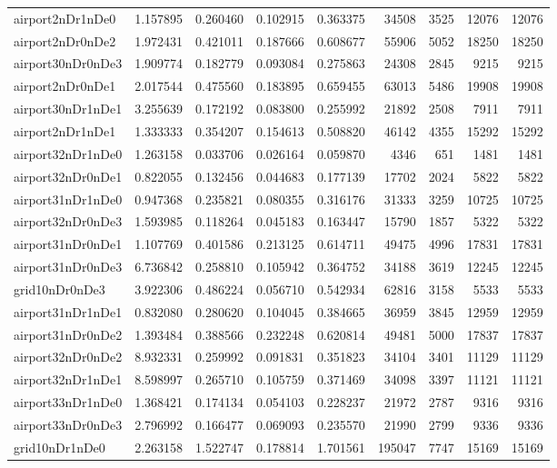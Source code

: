 \documentclass[../../../thesis.tex]{subfiles}
\begin{document}
\begin{longtable}{|l|r|r|r|r|r|r|r|r|}
airport2nDr1nDe0 & 1.157895 & 0.260460 & 0.102915 & 0.363375 & 34508 & 3525 & 12076 & 12076 \\
airport2nDr0nDe2 & 1.972431 & 0.421011 & 0.187666 & 0.608677 & 55906 & 5052 & 18250 & 18250 \\
airport30nDr0nDe3 & 1.909774 & 0.182779 & 0.093084 & 0.275863 & 24308 & 2845 & 9215 & 9215 \\
airport2nDr0nDe1 & 2.017544 & 0.475560 & 0.183895 & 0.659455 & 63013 & 5486 & 19908 & 19908 \\
airport30nDr1nDe1 & 3.255639 & 0.172192 & 0.083800 & 0.255992 & 21892 & 2508 & 7911 & 7911 \\
airport2nDr1nDe1 & 1.333333 & 0.354207 & 0.154613 & 0.508820 & 46142 & 4355 & 15292 & 15292 \\
airport32nDr1nDe0 & 1.263158 & 0.033706 & 0.026164 & 0.059870 & 4346 & 651 & 1481 & 1481 \\
airport32nDr0nDe1 & 0.822055 & 0.132456 & 0.044683 & 0.177139 & 17702 & 2024 & 5822 & 5822 \\
airport31nDr1nDe0 & 0.947368 & 0.235821 & 0.080355 & 0.316176 & 31333 & 3259 & 10725 & 10725 \\
airport32nDr0nDe3 & 1.593985 & 0.118264 & 0.045183 & 0.163447 & 15790 & 1857 & 5322 & 5322 \\
airport31nDr0nDe1 & 1.107769 & 0.401586 & 0.213125 & 0.614711 & 49475 & 4996 & 17831 & 17831 \\
airport31nDr0nDe3 & 6.736842 & 0.258810 & 0.105942 & 0.364752 & 34188 & 3619 & 12245 & 12245 \\
grid10nDr0nDe3 & 3.922306 & 0.486224 & 0.056710 & 0.542934 & 62816 & 3158 & 5533 & 5533 \\
airport31nDr1nDe1 & 0.832080 & 0.280620 & 0.104045 & 0.384665 & 36959 & 3845 & 12959 & 12959 \\
airport31nDr0nDe2 & 1.393484 & 0.388566 & 0.232248 & 0.620814 & 49481 & 5000 & 17837 & 17837 \\
airport32nDr0nDe2 & 8.932331 & 0.259992 & 0.091831 & 0.351823 & 34104 & 3401 & 11129 & 11129 \\
airport32nDr1nDe1 & 8.598997 & 0.265710 & 0.105759 & 0.371469 & 34098 & 3397 & 11121 & 11121 \\
airport33nDr1nDe0 & 1.368421 & 0.174134 & 0.054103 & 0.228237 & 21972 & 2787 & 9316 & 9316 \\
airport33nDr0nDe3 & 2.796992 & 0.166477 & 0.069093 & 0.235570 & 21990 & 2799 & 9336 & 9336 \\
grid10nDr1nDe0 & 2.263158 & 1.522747 & 0.178814 & 1.701561 & 195047 & 7747 & 15169 & 15169 \\

\end{longtable}
\end{document}

